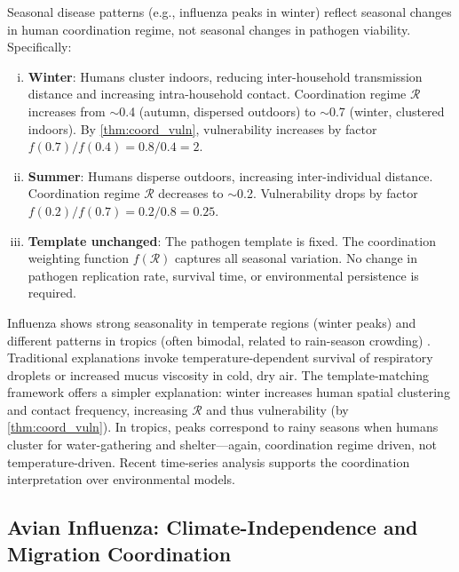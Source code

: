 \documentclass[11pt,twocolumn,a4paper]{article}
\newcommand{\Coord}{\mathcal{R}}
\begin{document}
\begin{proposition}
\label{prop:seasonality}
Seasonal disease patterns (e.g., influenza peaks in winter) reflect seasonal changes in human coordination regime, not seasonal changes in pathogen viability. Specifically:

\begin{enumerate}[(i)]
\item \textbf{Winter}: Humans cluster indoors, reducing inter-household transmission distance and increasing intra-household contact. Coordination regime $\Coord$ increases from $\sim$0.4 (autumn, dispersed outdoors) to $\sim$0.7 (winter, clustered indoors). By \cref{thm:coord_vuln}, vulnerability increases by factor $f(0.7)/f(0.4) = 0.8/0.4 = 2$.

\item \textbf{Summer}: Humans disperse outdoors, increasing inter-individual distance. Coordination regime $\Coord$ decreases to $\sim$0.2. Vulnerability drops by factor $f(0.2)/f(0.7) = 0.2/0.8 = 0.25$.

\item \textbf{Template unchanged}: The pathogen template is fixed. The coordination weighting function $f(\Coord)$ captures all seasonal variation. No change in pathogen replication rate, survival time, or environmental persistence is required.
\end{enumerate}
\end{proposition}

\begin{example}
Influenza shows strong seasonality in temperate regions (winter peaks) and different patterns in tropics (often bimodal, related to rain-season crowding) \cite{grenfell2001travelling}. Traditional explanations invoke temperature-dependent survival of respiratory droplets or increased mucus viscosity in cold, dry air. The template-matching framework offers a simpler explanation: winter increases human spatial clustering and contact frequency, increasing $\Coord$ and thus vulnerability (by \cref{thm:coord_vuln}). In tropics, peaks correspond to rainy seasons when humans cluster for water-gathering and shelter—again, coordination regime driven, not temperature-driven. Recent time-series analysis \cite{bjornstad2002dynamics} supports the coordination interpretation over environmental models.
\end{example}

\subsection{Avian Influenza: Climate-Independence and Migration Coordination}
\end{document}
